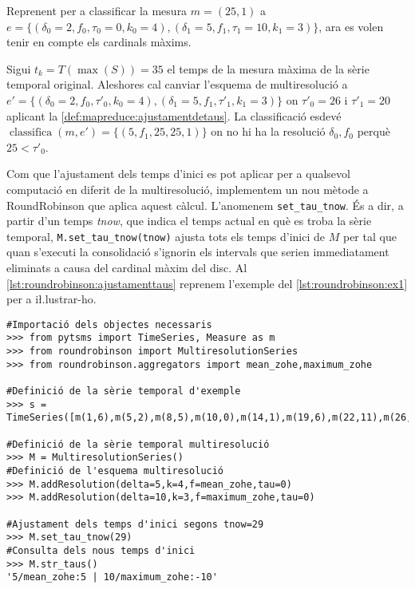 \begin{example}
  \label{ex:mapreduce:classifica-ajustament}
  Reprenent  per a
  classificar la mesura $m=(25,1)$ a
  $e=\{(\delta_0=2,f_0,\tau_0=0,k_0=4),(\delta_1=5,f_1,\tau_1=10,k_1=3)\}$,
  ara es volen tenir en compte els cardinals màxims.
    
  Sigui $t_k=T(\max(S))=35$ el temps de la mesura màxima de la sèrie
  temporal original. Aleshores cal canviar l'esquema de multiresolució
  a
  $e'=\{(\delta_0=2,f_0,\tau'_0,k_0=4),(\delta_1=5,f_1,\tau'_1,k_1=3)\}$
  on $\tau'_0=26$ i $\tau'_1=20$ aplicant la
  \autoref{def:mapreduce:ajustamentdetaus}. La classificació esdevé
  $\operatorname{classifica}(m,e')=\{ (5,f_1,25,25,1) \}$ on no hi ha
  la resolució $\delta_0,f_0$ perquè $25< \tau'_0$.
\end{example}



Com que l'ajustament dels temps d'inici es pot aplicar per a qualsevol
computació en diferit de la multiresolució, implementem un nou mètode
a RoundRobinson que aplica aquest càlcul. L'anomenem
\lstinline[style=py]+set_tau_tnow+. És a dir, a partir d'un temps
\emph{tnow}, que indica el temps actual en què es troba la sèrie
temporal, \lstinline[style=py]+M.set_tau_tnow(tnow)+ ajusta tots els
temps d'inici de $M$ per tal que quan s'executi la consolidació
s'ignorin els intervals que serien immediatament eliminats a causa del
cardinal màxim del disc.  Al
\autoref{lst:roundrobinson:ajustamenttaus} reprenem l'exemple del
\autoref{lst:roundrobinson:ex1} per a i\l.lustrar-ho.

\begin{lstlisting}[style=py,caption=Exemple d'ajustament dels temps
    d'inici amb RoundRobinson,label=lst:roundrobinson:ajustamenttaus]
#Importació dels objectes necessaris
>>> from pytsms import TimeSeries, Measure as m
>>> from roundrobinson import MultiresolutionSeries
>>> from roundrobinson.aggregators import mean_zohe,maximum_zohe

#Definició de la sèrie temporal d'exemple
>>> s = TimeSeries([m(1,6),m(5,2),m(8,5),m(10,0),m(14,1),m(19,6),m(22,11),m(26,6),m(29,0)])

#Definició de la sèrie temporal multiresolució
>>> M = MultiresolutionSeries()
#Definició de l'esquema multiresolució
>>> M.addResolution(delta=5,k=4,f=mean_zohe,tau=0)
>>> M.addResolution(delta=10,k=3,f=maximum_zohe,tau=0)

#Ajustament dels temps d'inici segons tnow=29
>>> M.set_tau_tnow(29)
#Consulta dels nous temps d'inici
>>> M.str_taus()
'5/mean_zohe:5 | 10/maximum_zohe:-10'
\end{lstlisting}



